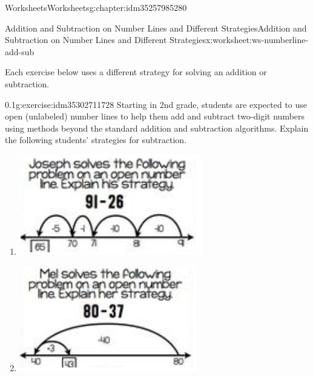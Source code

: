 \documentclass[twoside,11pt,]{book}
\begin{document}
\begin{chapterptx}{Worksheets}{}{Worksheets}{}{}{g:chapter:idm35257985280}
\begin{worksheet-section-numberless}{Addition and Subtraction on Number Lines and Different Strategies}{}{Addition and Subtraction on Number Lines and Different Strategies}{}{}{x:worksheet:ws-numberline-add-sub}
\begin{introduction}{}%
Each exercise below uses a different strategy for solving an addition or subtraction.%
\end{introduction}%
\begin{divisionexercise}{1}{}{0.1}{g:exercise:idm35302711728}%
Starting in 2nd grade, students are expected to use open (unlabeled) number lines to help them add and subtract two-digit numbers using methods beyond the standard addition and subtraction algorithms.   Explain the following students’ strategies for subtraction.%
%
\begin{enumerate}[label=(\alph*)]
\item{}\begin{sidebyside}{1}{0.15}{0.15}{0}%
\begin{sbspanel}{0.7}%
\includegraphics[width=1\linewidth]{images/numberline-add-sub-1a.png}
\end{sbspanel}%
\end{sidebyside}%
%
\item{}\begin{sidebyside}{1}{0.15}{0.15}{0}%
\begin{sbspanel}{0.7}%
\includegraphics[width=1\linewidth]{images/numberline-add-sub-1b.png}

\end{sbspanel}
\end{sidebyside}
\end{enumerate}
\end{divisionexercise}
\end{worksheet-section-numberless}
\end{chapterptx}
\end{document}
